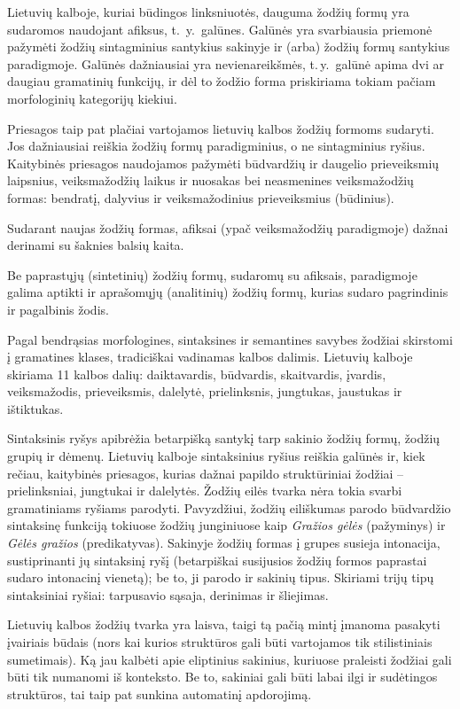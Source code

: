 \begin{multicols}{2}
Lietuvių kalboje, kuriai būdingos linksniuotės, dauguma žodžių formų yra sudaromos naudojant afiksus, t.~y.~galūnes. Galūnės yra svarbiausia priemonė pažymėti žodžių sintagminius santykius sakinyje ir (arba) žodžių formų santykius paradigmoje.   Galūnės dažniausiai yra nevienareikšmės, t.\,y.~galūnė apima dvi ar daugiau gramatinių funkcijų, ir dėl to žodžio forma priskiriama tokiam pačiam morfologinių kategorijų kiekiui.
   
Priesagos taip pat plačiai vartojamos lietuvių kalbos žodžių formoms sudaryti. Jos dažniausiai reiškia žodžių formų paradigminius, o ne sintagminius ryšius. Kaitybinės priesagos naudojamos pažymėti būdvardžių ir daugelio prieveiksmių laipsnius, veiksmažodžių laikus ir nuosakas bei neasmenines veiksmažodžių formas: bendratį, dalyvius ir veiksmažodinius prieveiksmius (būdinius).

Sudarant naujas žodžių formas, afiksai (ypač veiksmažodžių paradigmoje) dažnai derinami su šaknies balsių kaita.

Be paprastųjų (sintetinių) žodžių formų, sudaromų su afiksais, paradigmoje galima aptikti ir aprašomųjų (analitinių) žodžių formų, kurias sudaro pagrindinis ir pagalbinis žodis.

Pagal bendrąsias morfologines, sintaksines ir semantines savybes žodžiai skirstomi į gramatines klases, tradiciškai vadinamas kalbos dalimis. Lietuvių kalboje skiriama 11 kalbos dalių: daiktavardis, būdvardis, skaitvardis, įvardis, veiksmažodis, prieveiksmis, dalelytė, prielinksnis, jungtukas, jaustukas ir ištiktukas.

Sintaksinis ryšys apibrėžia betarpišką santykį tarp sakinio žodžių formų, žodžių grupių ir dėmenų. Lietuvių kalboje sintaksinius ryšius reiškia galūnės ir, kiek rečiau, kaitybinės priesagos, kurias dažnai papildo struktūriniai žodžiai – prielinksniai, jungtukai ir dalelytės. Žodžių eilės tvarka nėra tokia svarbi gramatiniams ryšiams parodyti. Pavyzdžiui, žodžių eiliškumas parodo būdvardžio sintaksinę funkciją tokiuose žodžių junginiuose kaip  \textit{Gražios gėlės} (pažyminys) ir  \textit{Gėlės gražios} (predikatyvas). Sakinyje žodžių formas į grupes susieja intonacija, sustiprinanti jų sintaksinį ryšį (betarpiškai susijusios žodžių formos paprastai sudaro intonacinį vienetą); be to, ji parodo ir sakinių tipus. Skiriami trijų tipų sintaksiniai ryšiai: tarpusavio sąsaja, derinimas ir šliejimas.

Lietuvių kalbos žodžių tvarka yra laisva, taigi tą pačią mintį įmanoma pasakyti įvairiais būdais (nors kai kurios struktūros gali būti vartojamos tik stilistiniais sumetimais). Ką jau kalbėti apie eliptinius sakinius, kuriuose praleisti žodžiai gali būti tik numanomi iš konteksto. Be to, sakiniai gali būti labai ilgi ir sudėtingos struktūros, tai taip pat sunkina automatinį apdorojimą.


\end{multicols}

